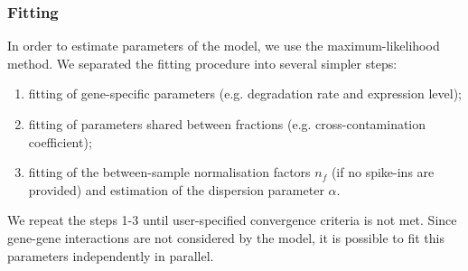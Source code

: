 \subsubsection{Fitting}
In order to estimate parameters of the model, we use the maximum-likelihood method.
We separated the fitting procedure into several simpler steps:
\begin{enumerate}
 \item fitting of gene-specific parameters (e.g. degradation rate and expression level);
 \item fitting of parameters shared between fractions (e.g. cross-contamination coefficient); 
 \item fitting of the between-sample normalisation factors $n_f$
 (if no spike-ins are provided) and estimation of the dispersion parameter $\alpha$.
\end{enumerate}
We repeat the steps 1-3 until
user-specified convergence criteria is not met.
 Since gene-gene interactions are not considered by the model, it is possible to 
 fit this parameters independently in parallel. 

